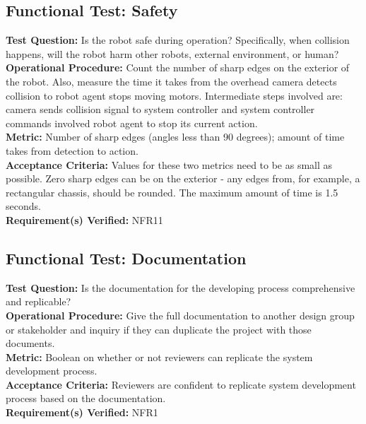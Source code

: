 \subsection{Functional Test: Safety}
\label{test:sys_ft_safety}
\textbf{Test Question:} Is the robot safe during operation? Specifically, when collision happens, will the robot harm other robots, external environment, or human?\\
\textbf{Operational Procedure:} Count the number of sharp edges on the exterior of the robot. Also, measure the time it takes from the overhead camera detects collision to robot agent stops moving motors. Intermediate steps involved are: camera sends collision signal to system controller and system controller commands involved robot agent to stop its current action. \\
\textbf{Metric:} Number of sharp edges (angles less than 90 degrees); amount of time takes from detection to action.\\
\textbf{Acceptance Criteria:} Values for these two metrics need to be as small as possible. Zero sharp edges can be on the exterior - any edges from, for example, a rectangular chassis, should be rounded. The maximum amount of time is 1.5 seconds. \\
\textbf{Requirement(s) Verified:} NFR11 \\

\subsection{Functional Test: Documentation}
\label{test:sys_ft_Documentation}
\textbf{Test Question:} Is the documentation for the developing process comprehensive and replicable?\\
\textbf{Operational Procedure:} Give the full documentation to another design group or stakeholder and inquiry if they can duplicate the project with those documents.\\
\textbf{Metric:} Boolean on whether or not reviewers can replicate the system development process.\\
\textbf{Acceptance Criteria:} Reviewers are confident to replicate system development process based on the documentation.\\
\textbf{Requirement(s) Verified:} NFR1 \\
